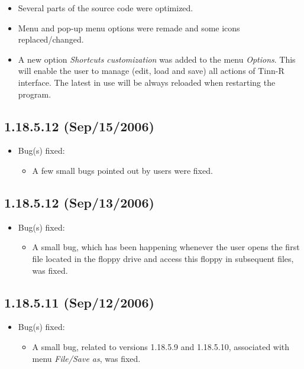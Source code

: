 \begin{itemize}
  \item Several parts of the source code were optimized.
  \item Menu and pop-up menu options were remade and some icons replaced/changed.
  \item A new option \textit{Shortcuts customization} was added to the menu
    \textit{Options}. This will enable the user to manage (edit, load and save)
    all actions of Tinn-R interface. The latest in use will be always reloaded
    when restarting the program.
\end{itemize}


\subsection{1.18.5.12 (Sep/15/2006)}

\begin{itemize}
  \item Bug(s) fixed:
    \begin{itemize}
      \item A few small bugs pointed out by users were fixed.
    \end{itemize}
\end{itemize}


\subsection{1.18.5.12 (Sep/13/2006)}

\begin{itemize}
  \item Bug(s) fixed:
    \begin{itemize}
      \item A small bug, which has been happening whenever the user opens the first file
        located in the floppy drive and access this floppy in subsequent files, was fixed.
    \end{itemize}
\end{itemize}


\subsection{1.18.5.11 (Sep/12/2006)}

\begin{itemize}
  \item Bug(s) fixed:
    \begin{itemize}
      \item A small bug, related to versions 1.18.5.9 and 1.18.5.10, associated with
        menu \textit{File/Save as}, was fixed.
    \end{itemize}
\end{itemize}



